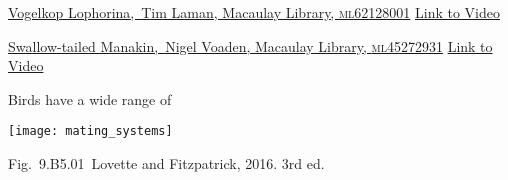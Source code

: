 \documentclass[t]{beamer}
\newcommand{\cornell}[1]{Fig.~#1~Lovette and Fitzpatrick, 2016. 3rd ed.}
\begin{document}

{
\begin{frame}[b,plain]
	
	\vfilll
	
	\tinyfill  \textcolor{white}{\href{https://www.macaulaylibrary.org/2017/06/30/dance-moves-support-evidence-for-new-bird-of-paradise-species/}{Vogelkop Lophorina, \textcopyright\,Tim Laman, Macaulay Library, \textsc{ml62128001}} \href{https://www.youtube.com/watch?v=rX40mBb8bkU}{Link to Video}}
\end{frame}
}


{
\begin{frame}[b,plain]
	
	\vfilll
	
	\tiny  \textcolor{black}{\href{https://macaulaylibrary.org/asset/45272931}{Swallow-tailed Manakin, \textcopyright\,Nigel Voaden, Macaulay Library, \textsc{ml45272931}} \href{https://www.youtube.com/watch?v=1zxJPQlFFTI}{Link to Video}}
\end{frame}
}


\begin{frame}[t]{Birds have a wide range of }

\vspace{-0.5\baselineskip}


\texttt{[image: mating\_systems]}

\vfilll

\tinyfill \cornell{9.B5.01}

\end{frame}

\end{document}
